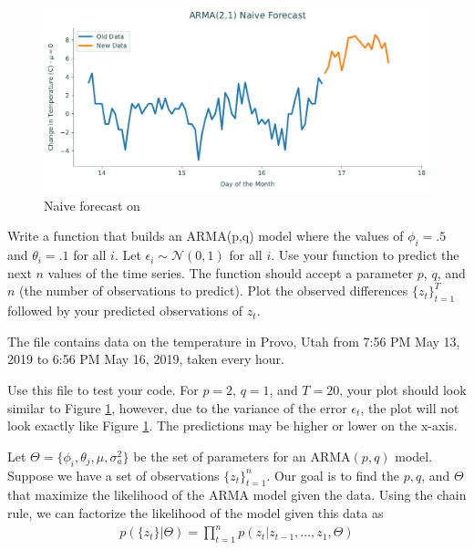 \begin{figure}[H]
\centering
\includegraphics[width=\textwidth]{figures/naive.pdf}
\caption{Naive forecast on }
\label{fig:ARMA:naive}
\end{figure}

\begin{problem}
Write a function  that builds an ARMA(p,q) model where the values of $\phi_i=.5$ and $\theta_i=.1$ for all $i$.
Let $\epsilon_i\sim\mathscr{N}(0,1)$ for all $i$.
Use your function to predict the next $n$ values of the time series.
The function should accept a parameter $p$, $q$, and $n$ (the number of observations to predict).
Plot the observed differences $\{z_t\}_{t=1}^T$ followed by your predicted observations of $z_t$.

The file  contains data on the temperature in Provo, Utah from 7:56 PM May 13, 2019 to 6:56 PM May 16, 2019, taken every hour.

Use this file to test your code.
For $p=2$, $q=1$, and $T=20$, your plot should look similar to Figure \ref{fig:ARMA:naive}, however, due to the variance of the error $\epsilon_t$, the plot will not look exactly like Figure \ref{fig:ARMA:naive}.
The predictions may be higher or lower on the x-axis.
\label{prob:arma:naive}
\end{problem}

Let $\Theta = \{\phi_i, \theta_j, \mu, \sigma_a^2\}$ be the set of parameters
for an $\text{ARMA}(p,q)$ model.
Suppose we have a set of observations $\{z_t\}_{t=1}^n$.
Our goal is to find the $p,q$, and $\Theta$ that maximize the likelihood of the ARMA model given the data.
Using the chain rule, we can factorize the likelihood of the model given this data as
\begin{align}
    \label{eq:arma:factorized}
    p(\{z_t\} | \Theta) = \prod_{t=1}^{n} p(z_t | z_{t-1}, \ldots, z_{1},
    \Theta)
\end{align}

